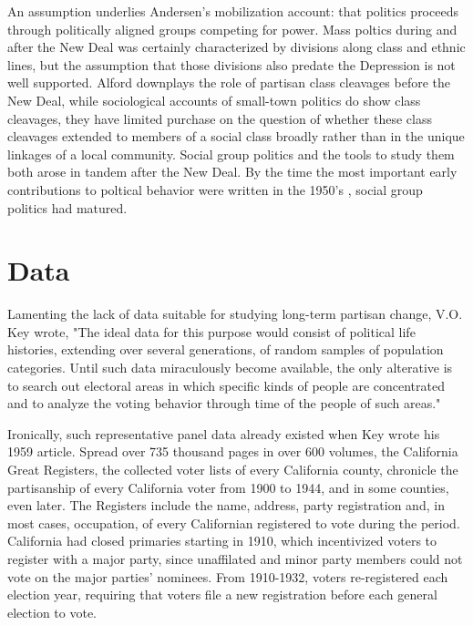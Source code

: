 \documentclass[11pt]{scrartcl}\usepackage[]{graphicx}\usepackage[]{color}
\begin{document}
An assumption underlies Andersen's mobilization account: that politics proceeds through politically aligned  groups competing for power. Mass poltics during and after the New Deal was certainly characterized by divisions along class and ethnic lines, but the assumption that those divisions also predate the Depression is not well supported.  Alford \citeyearpar{alford1963role} downplays the role of partisan class cleavages before the New Deal, while sociological accounts of small-town politics \citep{lynd1929middletown} do show class cleavages, they have limited purchase on the question of whether these class cleavages extended to members of a social class broadly rather than in the unique linkages of a local community. Social group politics and the tools to study them both arose in tandem after the New Deal.  By the time the most important early contributions to poltical behavior were written in the 1950's \citep{campbell1960american,berelson1954voting}, social group politics had matured.

\section*{Data}

Lamenting the lack of data suitable for studying long-term partisan change, V.O. Key \citeyearpar{key1959secular} wrote, "The ideal data for this purpose would consist of political life histories, extending over several generations, of random samples of population categories. Until such data miraculously become available, the only alterative is to search out electoral areas in which specific kinds of people are concentrated and to analyze the voting behavior through time of the people of such areas."

Ironically, such representative panel data already existed when Key wrote his 1959 article. Spread over 735 thousand pages in over 600 volumes, the California Great Registers, the collected voter lists of every California county, chronicle the partisanship of every California voter from 1900 to 1944, and in some counties, even later.  The Registers include the name, address, party registration and, in most cases, occupation, of every Californian registered to vote during the period. California had closed primaries starting in 1910, which incentivized voters to register with a major party, since unaffilated and minor party members could not vote on the major parties' nominees.   From 1910-1932, voters re-registered each election year, requiring that voters file a new registration before each general election to vote. 
\end{document}

